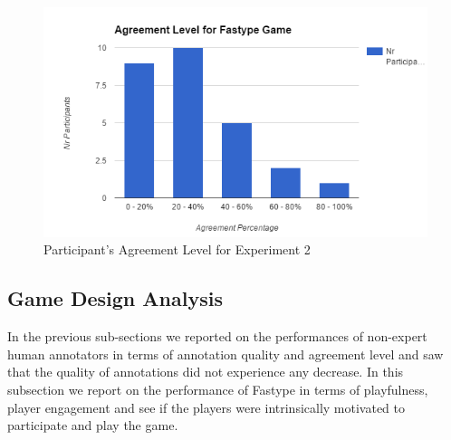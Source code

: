\begin{figure}[]
    \centering
    \includegraphics[width=\linewidth]{figures/experiment2/ex2-agreementlevel.PNG}
    \caption{Participant's Agreement Level for Experiment 2}
    \label{fig:game-agreement-level}
\end{figure}

\subsection{Game Design Analysis}
In the previous sub-sections we reported on the performances of non-expert human annotators in terms of annotation quality and agreement level and saw that the quality of annotations did not experience any decrease. In this subsection we report on the performance of Fastype in terms of playfulness, player engagement and see if the players were intrinsically motivated to participate and play the game. 

